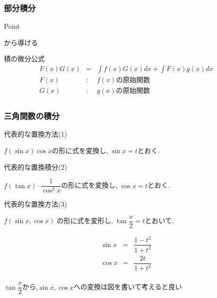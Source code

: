 \documentclass[a4paper]{jsarticle}
\begin{document}
\subsubsection{部分積分}
\begin{itembox}[l]{Point}
    \begin{center}
        から導ける
    \end{center}
\end{itembox}
\begin{itembox}[l]{積の微分公式}
    \begin{eqnarray*}
        F\left(x\right)G\left(x\right)&=&\displaystyle\int f\left(x\right)G\left(x\right)dx+\int F\left(x\right)g\left(x\right)dx\\
        F\left(x\right)&:&f\left(x\right)の原始関数\\
        G\left(x\right)&:&g\left(x\right)の原始関数\\
    \end{eqnarray*}
\end{itembox}
\subsubsection{三角関数の積分}
\begin{itembox}[l]{代表的な置換方法(1)}
    \begin{center}
        $f\left(\sin x\right)\cos x$の形に式を変換し,$\; \sin x= t$とおく.
    \end{center}
\end{itembox}
\begin{itembox}[l]{代表的な置換積分(2)}
    \begin{center}
        $f\left(\tan x\right)\cdot \dfrac{1}{\cos^2 x}$の形に式を変換し,$\; \cos x= t$とおく.
    \end{center}
\end{itembox}
\begin{itembox}[l]{代表的な置換方法(3)}
    \begin{center}
        $f\left(\sin x,\cos x\right)\;$の形に式を変形し,$\; \tan\dfrac{x}{2}=t$とおいて,
    \end{center}
    \begin{eqnarray*}
        \sin x&=&\dfrac{1-t^2}{1+t^2}\\
        \cos x&=&\dfrac{2t}{1+t^2}\\
    \end{eqnarray*}
    \begin{center}
        $\tan\dfrac{x}{2}$から,$\sin x,\cos x$への変換は図を書いて考えると良い
    \end{center}
\end{itembox}
\end{document}
